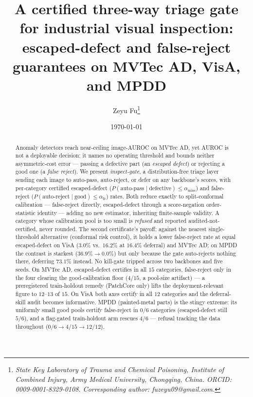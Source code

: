\documentclass[11pt]{article}
\title{A certified three-way triage gate for industrial visual inspection:
escaped-defect and false-reject guarantees on MVTec AD, VisA, and MPDD}
\author{Zeyu Fu\thanks{\textit{State Key Laboratory of Trauma and Chemical Poisoning,
Institute of Combined Injury, Army Medical University, Chongqing, China.
ORCID: 0009-0001-8329-0108. Corresponding author: fuzeyu09@gmail.com.}}}
\date{\today}
\begin{document}
\maketitle

\begin{abstract}
\noindent Anomaly detectors reach near-ceiling image-AUROC on MVTec AD, yet AUROC is not a
deployable decision: it names no operating threshold and bounds neither asymmetric-cost error ---
passing a defective part (an \emph{escaped defect}) or rejecting a good one (a \emph{false reject}).
We present \emph{inspect-gate}, a distribution-free triage layer sending each image to auto-pass,
auto-reject, or defer on any backbone's scores, with per-category certified escaped-defect
($P(\text{auto-pass}\mid\text{defective}) \le \alpha_{\text{miss}}$) and false-reject
($P(\text{auto-reject}\mid\text{good}) \le \alpha_{\text{fr}}$) rates. Both reduce exactly to
split-conformal calibration --- false-reject directly, escaped-defect through a score-negation
order-statistic identity --- adding no new estimator, inheriting finite-sample validity. A
category whose calibration pool is too small is \emph{refused} and reported
audited-not-certified, never rounded. The second certificate's payoff: against the nearest
single-threshold alternative (conformal risk control), it holds a lower false-reject rate at
equal escaped-defect on VisA ($3.0\%$ vs.\ $16.2\%$ at $16.4\%$ deferral) and MVTec AD; on MPDD
the contrast is starkest ($36.9\%\to0.0\%$) but only because the gate auto-rejects nothing there,
deferring $73.1\%$ instead. No kill-gate tripped across two
backbones and five seeds. On MVTec AD, escaped-defect certifies in all $15$ categories,
false-reject only in the four clearing the good-calibration floor ($4/15$, a pool-size artifact)
--- a preregistered train-holdout remedy (PatchCore only) lifts the deployment-relevant figure to
$12$--$13$ of $15$. On VisA
both axes certify in all $12$ categories and the deferral-skill audit becomes informative. MPDD
(painted-metal parts) is the stingy extreme: its uniformly small good pools certify false-reject
in $0/6$ categories (escaped-defect still $5/6$), and a flag-gated
train-holdout arm rescues $4/6$ --- refusal tracking the data throughout ($0/6 \to 4/15 \to
12/12$).
\end{abstract}
\end{document}
